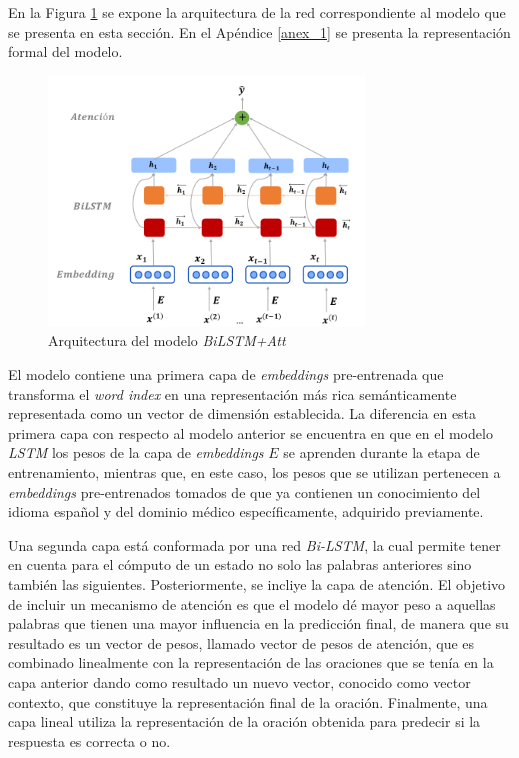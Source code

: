 En la Figura \ref{bilstm} se expone la arquitectura de la red correspondiente al modelo que se presenta en esta sección. En el Apéndice \ref{anex_1} se presenta la representación formal del modelo.

\begin{figure}[!tb]
  \begin{center}
    \includegraphics[angle=0, width=0.75\textwidth]{Graphics/bilstm.png}
  \end{center}
    \caption{Arquitectura del modelo \textit{BiLSTM+Att}}\label{bilstm}
\end{figure}

El modelo contiene una primera capa de \textit{embeddings} pre-entrenada que transforma el \textit{word index} en una representación más rica semánticamente representada como un vector de dimensión establecida. La diferencia en esta primera capa con respecto al modelo anterior se  encuentra en que en el modelo \textit{LSTM} los pesos de la capa de \textit{embeddings} $E$ se aprenden durante la etapa de entrenamiento, mientras que, en este caso, los pesos que se utilizan pertenecen a \textit {embeddings} pre-entrenados tomados de \cite{2019-medical-fastext} que ya contienen un conocimiento del idioma español y del dominio médico específicamente, adquirido previamente.

Una segunda capa está conformada por una red \textit{Bi-LSTM}, la cual permite tener en cuenta para el cómputo de un estado no solo las palabras anteriores sino también las siguientes. Posteriormente, se incliye la capa de atención. El objetivo de incluir un mecanismo de atención es que el modelo dé mayor peso a aquellas palabras que tienen una mayor influencia en la predicción final, de manera que su resultado es un vector de pesos, llamado vector de pesos de atención, que es combinado linealmente con la representación de las oraciones que se tenía en la capa anterior dando como resultado un nuevo vector, conocido como vector contexto, que constituye la representación final de la oración. Finalmente, una capa lineal utiliza la representación de la oración obtenida para predecir si la respuesta es correcta o no.


